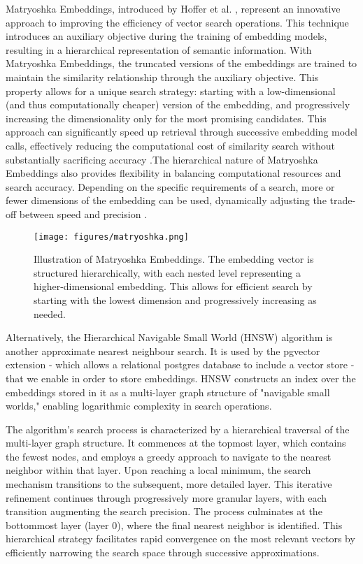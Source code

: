 \documentclass[a4paper, oneside]{discothesis}
\begin{document}
Matryoshka Embeddings, introduced by Hoffer et al. \cite{hoffer2018deep}, represent an innovative approach to improving the efficiency of vector search operations. This technique introduces an auxiliary objective during the training of embedding models, resulting in a hierarchical representation of semantic information. With Matryoshka Embeddings, the truncated versions of the embeddings are trained to maintain the similarity relationship through the auxiliary objective. This property allows for a unique search strategy: starting with a low-dimensional (and thus computationally cheaper) version of the embedding, and progressively increasing the dimensionality only for the most promising candidates. This approach can significantly speed up retrieval through successive embedding model calls, effectively reducing the computational cost of similarity search without substantially sacrificing accuracy \cite{hoffer2018deep}.The hierarchical nature of Matryoshka Embeddings also provides flexibility in balancing computational resources and search accuracy. Depending on the specific requirements of a search, more or fewer dimensions of the embedding can be used, dynamically adjusting the trade-off between speed and precision \cite{hoffer2018deep}.

\begin{figure}[h]
\centering
\texttt{[image: figures/matryoshka.png]}
\caption{Illustration of Matryoshka Embeddings. The embedding vector is structured hierarchically, with each nested level representing a higher-dimensional embedding. This allows for efficient search by starting with the lowest dimension and progressively increasing as needed.}
\label{fig:matryoshka_embeddings}
\end{figure}

Alternatively, the Hierarchical Navigable Small World (HNSW) algorithm \cite{malkov2018efficient} is another approximate nearest neighbour search. It is used by the pgvector extension - which allows a relational postgres database to include a vector store - that we enable in order to store embeddings. HNSW constructs an index over the embeddings stored in it as a multi-layer graph structure of "navigable small worlds," enabling logarithmic complexity in search operations.

The algorithm's search process is characterized by a hierarchical traversal of the multi-layer graph structure. It commences at the topmost layer, which contains the fewest nodes, and employs a greedy approach to navigate to the nearest neighbor within that layer. Upon reaching a local minimum, the search mechanism transitions to the subsequent, more detailed layer. This iterative refinement continues through progressively more granular layers, with each transition augmenting the search precision. The process culminates at the bottommost layer (layer 0), where the final nearest neighbor is identified. This hierarchical strategy facilitates rapid convergence on the most relevant vectors by efficiently narrowing the search space through successive approximations.
\end{document}
